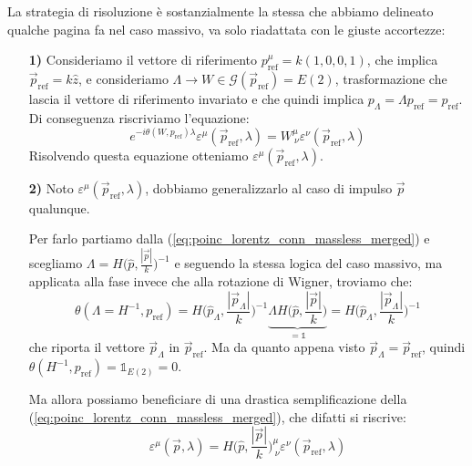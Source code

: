 \documentclass[../main.tex]{subfiles}
\begin{document}
La strategia di risoluzione è sostanzialmente la stessa che abbiamo delineato qualche pagina fa nel caso massivo, va solo riadattata con le giuste accortezze:
\begin{enumerate}
    \item[\textbf{1)}] Consideriamo il vettore di riferimento $p^\mu_\text{ref} = k(1,0,0,1)$, che implica $\Vec{p}_\text{ref} = k\hat{z}$, e consideriamo $\Lambda \rightarrow W\in \mathscr{G}(\Vec{p}_\text{ref}) = E(2)$, trasformazione che lascia il vettore di riferimento invariato e che quindi implica $p_\Lambda =\Lambda p_\text{ref} = p_\text{ref}$. Di conseguenza riscriviamo l'equazione:
    \begin{equation}
        \boxed{e^{-i\theta(W, p_\text{ref})\lambda}\varepsilon^\mu(\Vec{p}_\text{ref},\lambda) = W^\mu_{~\nu} \varepsilon^\nu(\Vec{p}_\text{ref},\lambda)}
        \label{eq:poinc_lorentz_conn_massless_merged_step1}
    \end{equation}
    Risolvendo questa equazione otteniamo $\varepsilon^\mu(\Vec{p}_\text{ref},\lambda)$.
    
    \item[\textbf{2)}] Noto $\varepsilon^\mu(\Vec{p}_\text{ref},\lambda)$, dobbiamo generalizzarlo al caso di impulso $\Vec{p}$ qualunque.

    Per farlo partiamo dalla (\ref{eq:poinc_lorentz_conn_massless_merged}) e scegliamo $\Lambda = H\big(\hat{p},\frac{|\Vec p|}{k}\big)^{-1}$ e seguendo la stessa logica del caso massivo, ma applicata alla fase invece che alla rotazione di Wigner, troviamo che:
    \[
    \theta(\Lambda = H^{-1}, p_\text{ref}) =  H\Big(\hat{p}_\Lambda,\frac{|\Vec p_\Lambda|}{k}\Big)^{-1}\underbrace{\Lambda H\Big(\hat{p},\frac{|\Vec p|}{k}\Big)}_{=\mathbb 1} = H\Big(\hat{p}_\Lambda,\frac{|\Vec p_\Lambda|}{k}\Big)^{-1}
    \]
    che riporta il vettore $\Vec p_\Lambda$ in $\Vec p_\text{ref}$. Ma da quanto appena visto $\Vec p_\Lambda =\Vec p_\text{ref}$, quindi $\theta(H^{-1}, p_\text{ref}) = \mathbb 1_{E(2)} = 0$.

    Ma allora possiamo beneficiare di una drastica semplificazione della (\ref{eq:poinc_lorentz_conn_massless_merged}), che difatti si riscrive:
    \begin{equation}
    \boxed{ \varepsilon^\mu(\Vec{p},\lambda)= H\Big(\hat{p},\frac{|\Vec p|}{k}\Big)^\mu_{~\nu}\varepsilon^\nu(\Vec{p}_\text{ref},\lambda)}
    \label{eq:poinc_lorentz_conn_massless_merged_step2}
\end{equation}
\end{enumerate}
\end{document}
